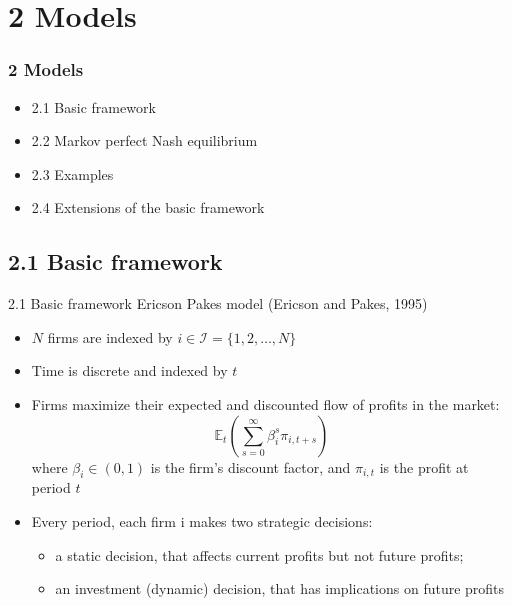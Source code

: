 \documentclass[aspectratio=169]{beamer}  %
\begin{document}
\section{2 Models}
\begin{frame}
\frametitle{2 Models}
    \begin{itemize}
        \item 2.1 Basic framework
        \item 2.2 Markov perfect Nash equilibrium
        \item 2.3 Examples
        \item 2.4 Extensions of the basic framework
    \end{itemize}
\end{frame}

\subsection{2.1 Basic framework}
\begin{frame}
{2.1 Basic framework}
Ericson Pakes model (Ericson and Pakes, 1995)
    \begin{itemize}
        \item \(N\) firms are indexed by \(i \in \mathcal{I} = \{1, 2, \ldots, N\}\)
        \item Time is discrete and indexed by \(t\)
        \item Firms maximize their expected and discounted flow of profits in the market:
            \[
            \mathbb{E}_t \left( \sum_{s=0}^{\infty} \beta_i^s \pi_{i,t+s} \right)
            \]
            where \(\beta_i \in (0, 1)\) is the firm's discount factor, and \(\pi_{i,t}\) is the profit at period \(t\)
        \item Every period, each firm i makes two strategic decisions: 
         \begin{itemize}
            \item a static decision, that affects current profits but not future profits; 
            \item  an investment (dynamic) decision, that has implications on future profits
        \end{itemize}
    \end{itemize}
\end{frame}
\end{document}
